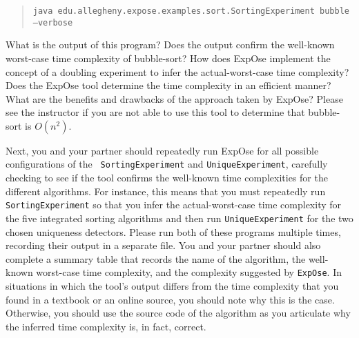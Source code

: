 \begin{quote}
{\tt java edu.allegheny.expose.examples.sort.SortingExperiment bubble --verbose}
\end{quote}

\noindent What is the output of this program? Does the output confirm the well-known worst-case time complexity of
bubble-sort? How does {\sc ExpOse} implement the concept of a doubling experiment to infer the actual-worst-case time
complexity? Does the {\sc ExpOse} tool determine the time complexity in an efficient manner? What are the benefits and
drawbacks of the approach taken by {\sc ExpOse}? Please see the instructor if you are not able to use this tool to
determine that bubble-sort is $O(n^2)$.

Next, you and your partner should repeatedly run {\sc ExpOse} for all possible configurations of the {\tt
SortingExperiment} and {\tt UniqueExperiment}, carefully checking to see if the tool confirms the well-known time
complexities for the different algorithms. For instance, this means that you must repeatedly run {\tt
SortingExperiment} so that you infer the actual-worst-case time complexity for the five integrated sorting
algorithms and then run {\tt UniqueExperiment} for the two chosen uniqueness detectors. Please run both of these
programs multiple times, recording their output in a separate file. You and your partner should also complete a
summary table that records the name of the algorithm, the well-known worst-case time complexity, and the complexity
suggested by {\tt ExpOse}. In situations in which the tool's output differs from the time complexity that you found
in a textbook or an online source, you should note why this is the case. Otherwise, you should use the source code
of the algorithm as you articulate why the inferred time complexity is, in fact, correct.


